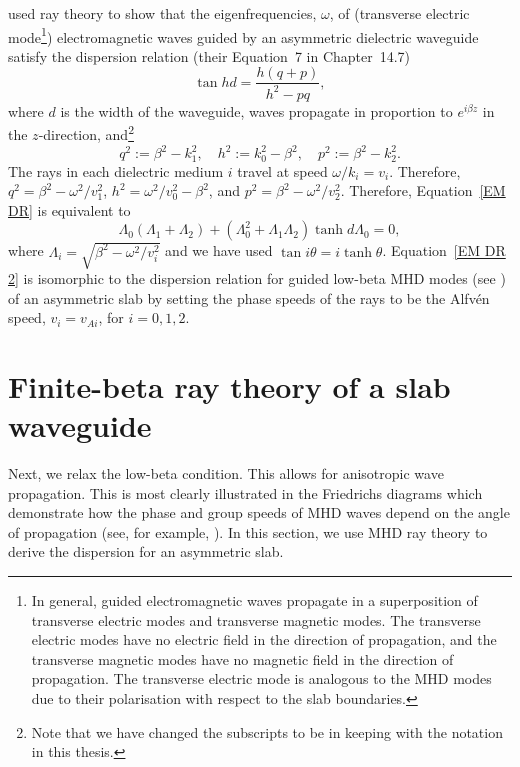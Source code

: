 	\cite{ram_etal84} used ray theory to show that the eigenfrequencies, $\omega$, of (transverse electric mode\footnote{In general, guided electromagnetic waves propagate in a superposition of transverse electric modes and transverse magnetic modes. The transverse electric modes have no electric field in the direction of propagation, and the transverse magnetic modes have no magnetic field in the direction of propagation. The transverse electric mode is analogous to the MHD modes due to their polarisation with respect to the slab boundaries.}) electromagnetic waves guided by an asymmetric dielectric waveguide satisfy the dispersion relation (their Equation~7 in Chapter~14.7)
	\begin{equation}
	\tan{hd} = \frac{h(q + p)}{h^2 - pq}, \label{EM DR}
	\end{equation}
	where $d$ is the width of the waveguide, waves propagate in proportion to $e^{i\beta z}$ in the $z$-direction, and\footnote{Note that we have changed the subscripts to be in keeping with the notation in this thesis.} 
	\begin{equation}
	q^2 := \beta^2 - k_1^2, \quad h^2 := k_0^2 - \beta^2, \quad p^2 := \beta^2 - k_2^2.
	\end{equation}
	The rays in each dielectric medium $i$ travel at speed $\omega/k_i = v_i$. Therefore, $q^2 = \beta^2 - \omega^2/v_1^2$, $h^2 = \omega^2/v_0^2 - \beta^2$, and $p^2 = \beta^2 - \omega^2/v_2^2$. Therefore, Equation~\eqref{EM DR} is equivalent to
	\begin{equation}
	\Lambda_0(\Lambda_1 + \Lambda_2) + (\Lambda_0^2 + \Lambda_1\Lambda_2)\tanh{d\Lambda_0} = 0, \label{EM DR 2}
	\end{equation}
	where $\Lambda_i = \sqrt{\beta^2 - \omega^2/v_i^2}$ and we have used $\tan{i\theta} = i \tanh{\theta}$. Equation~\eqref{EM DR 2} is isomorphic to the dispersion relation for guided low-beta MHD modes (see \citealp{all_etal17}) of an asymmetric slab by setting the phase speeds of the rays to be the Alfv\'{e}n speed, $v_i = v_{Ai}$, for $i = 0, 1, 2$.
	
	
	\section{Finite-beta ray theory of a slab waveguide}
	\label{sec: finite beta}
	
	Next, we relax the low-beta condition. This allows for anisotropic wave propagation. This is most clearly illustrated in the Friedrichs diagrams which demonstrate how the phase and group speeds of MHD waves depend on the angle of propagation (see, for example, \citealp{goe_etal04,pri14}). In this section, we use MHD ray theory to derive the dispersion for an asymmetric slab.
	
